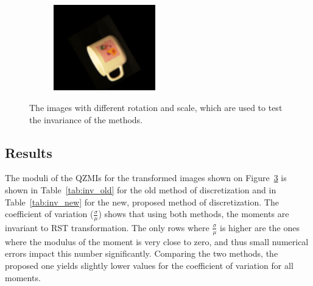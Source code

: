 \begin{figure}[tbp]
\begin{subfigure}{0.3\textwidth}
    \caption{}\label{fig:inv_img5}
	\end{subfigure}
	\begin{subfigure}{0.3\textwidth}
        \centering
    \includegraphics[width=125pt]{figures/inv_img/36x8y5r120s1_25.png}
    \caption{}\label{fig:inv_img6}
	\end{subfigure}
	\caption{The images with different rotation and scale, which are used to test the invariance of the methods.}
	\label{fig:inv_img}
\end{figure}

\subsection{Results}
The moduli of the QZMIs for the transformed images shown on Figure~\ref{fig:inv_img} is shown in Table~\ref{tab:inv_old} for the old method of discretization and in Table~\ref{tab:inv_new} for the new, proposed method of discretization. The coefficient of variation ($\frac{\sigma}{\mu}$) shows that using both methods, the moments are invariant to RST transformation. The only rows where $\frac{\sigma}{\mu}$ is higher are the ones where the modulus of the moment is very close to zero, and thus small numerical errors impact this number significantly. Comparing the two methods, the proposed one yields slightly lower values for the coefficient of variation for all moments.


